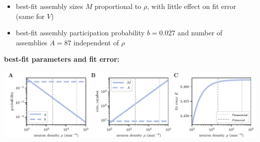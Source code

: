 \documentclass[8pt,t,usepdftitle=false]{beamer}
\begin{document}
\begin{frame}[plain]
  \frametitle{\ttl}
  \begin{itemize}
  \item<1-> best-fit assembly sizes $M$ proportional to $\rho$, with little effect on fit error (same for $V$)
  \item<1-> best-fit assembly participation probability $b=0.027$ and number of assemblies $A=87$ independent of $\rho$
  \end{itemize}
  \vspace*{0.5ex}
  {\small\bf best-fit parameters and fit error:}
  \begin{center}
    \parbox{\linewidth}{%
      \includegraphics[width=0.9\linewidth]{./figures/minimal_model_fit_range_pars.pdf}
    }
  \end{center}
\end{frame}
\end{document}
